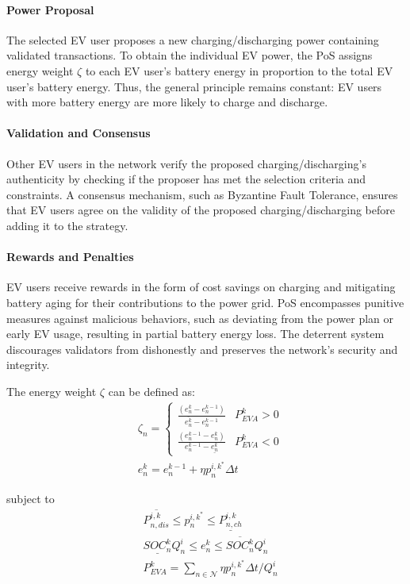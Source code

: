 \documentclass[journal,twoside]{IEEEtran}
\begin{document}
\paragraph{Power Proposal} The selected EV user proposes a new charging/discharging power containing validated transactions. To obtain the individual EV power, the PoS assigns energy weight $\zeta$ to each EV user's battery energy in proportion to the total EV user's battery energy. Thus, the general principle remains constant: EV users with more battery energy are more likely to charge and discharge.

\paragraph{Validation and Consensus} Other EV users in the network verify the proposed charging/discharging's authenticity by checking if the proposer has met the selection criteria and constraints. A consensus mechanism, such as Byzantine Fault Tolerance, ensures that EV users agree on the validity of the proposed charging/discharging before adding it to the strategy.

\paragraph{Rewards and Penalties} EV users receive rewards in the form of cost savings on charging and mitigating battery aging for their contributions to the power grid. PoS encompasses punitive measures against malicious behaviors, such as deviating from the power plan or early EV usage, resulting in partial battery energy loss. The deterrent system discourages validators from dishonestly and preserves the network's security and integrity.

The energy weight $\zeta$ can be defined as:
\begin{align}
&\zeta_n=\left\{\begin{array}{cc}
\frac{(e_{n}^{k}-e_{n}^{k-1})}{\overline{e_{n}^{k}}-e_{n}^{k-1}} &P_{EVA}^{k}>0 \\
\frac{(e_{n}^{k-1}-e_{n}^{k})}{e_{n}^{k-1}-\underline{e_{n}^{k}}} &P_{EVA}^{k}<0
\end{array}\right.\label{kappa}\\
&e_{n}^{k}=e_{n}^{k-1}+{\eta p_{n}^{i,k^{*}}}\Delta t\label{evsoc}
\end{align}

subject to
\begin{align}
&\overline{P_{n,dis}^{i,k}}\leq p_{n}^{i,k^{*}}\leq \underline{P_{n,ch}^{i,k}}\\
&\underline{SOC_{n}^{k}}{Q^i_n}\leq e_{n}^{k}\leq \overline{SOC_{n}^{k}}{Q^i_n}\label{deps}\\
&P_{EVA}^{k}=\sum\limits_{n \in \mathcal{N}}{{\eta p_{n}^{i,k^{*}}}\Delta t}/{Q^i_n}\label{powerall}
\end{align}
\end{document}
